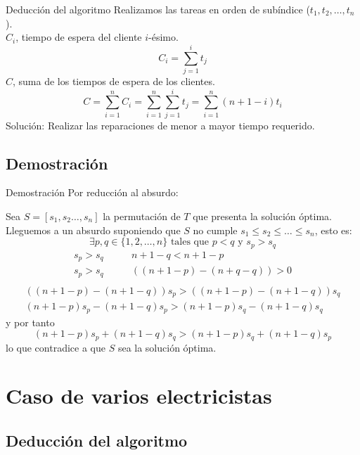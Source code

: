 \documentclass[serif,9pt]{beamer}
\begin{document}
\begin{frame}{Deducción del algoritmo}
  Realizamos las tareas en orden de subíndice ($t_1,t_2,\ldots,t_n$).\\
  \pause
  $C_i$, tiempo de espera del cliente $i$-ésimo.
  \[C_i=\sum_{j=1}^it_j\]
  \pause
  $C$, suma de los tiempos de espera de los clientes.
  \[C = \sum_{i=1}^n C_i = \sum_{i=1}^n \sum_{j=1}^i t_j =
    \sum_{i=1}^n(n+1-i)t_i\]
  \pause
  Solución: Realizar las reparaciones de menor a mayor tiempo
  requerido.
\end{frame}

\subsection{Demostración}

\begin{frame}{Demostración}
  Por reducción al absurdo:
  
  \vspace{5mm}
  
  Sea $S=[s_1,s_2\ldots,s_n]$ la
  permutación de $T$ que presenta la solución óptima. \\ \pause
  Lleguemos a un absurdo suponiendo que $S$ no cumple
  $s_1 \leq s_2 \leq \ldots \leq s_n$, esto es:
  \[\exists p,q \in \{1,2,\ldots,n\} \mbox{ tales que } p<q \mbox{ y }
    s_p > s_q\]
  \pause
  \vspace{-5mm}
  \begin{align*}
    s_p > s_q& \qquad n+1-q < n+1-p\\
    s_p > s_q& \qquad ((n+1-p) - (n+q-q)) > 0 \\
  \end{align*}
  \pause
  \vspace{-10mm}
  \begin{align*}    
    ((n+1-p) - (n+1-q))s_p > ((n+1-p) - (n+1-q))s_q \\
    (n+1-p)s_p - (n+1-q)s_p > (n+1-p)s_q - (n+1-q)s_q
  \end{align*}
  \pause
  y por tanto
  \[(n+1-p)s_p + (n+1-q)s_q > (n+1-p)s_q + (n+1-q)s_p\]
  lo que contradice a que $S$ sea la solución óptima. \\
  \hfill\qedsymbol
\end{frame}

\section{Caso de varios electricistas}

\subsection{Deducción del algoritmo}
\end{document}
